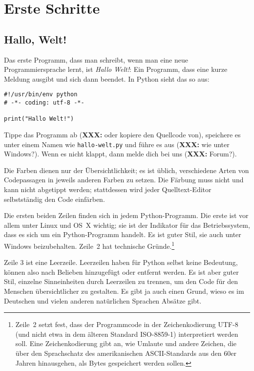 \documentclass{blatt}
\newcommand{\XXX}[1]{\textbf{XXX:} #1}
\begin{document}
\section{Erste Schritte}

\subsection{Hallo, Welt!}

Das erste Programm, dass man schreibt, wenn man eine neue Programmiersprache
lernt, ist \emph{Hallo Welt!}: Ein Programm, dass eine kurze Meldung ausgibt
und sich dann beendet. In Python sieht das so aus:

\begin{verbatim}
#!/usr/bin/env python
# -*- coding: utf-8 -*-

print("Hallo Welt!")
\end{verbatim}

Tippe das Programm ab (\XXX{oder kopiere den Quellcode von}), speichere es unter
einem Namen wie \texttt{hallo-welt.py} und führe es aus (\XXX{wie unter Windows?}).
Wenn es nicht klappt, dann melde dich bei uns (\XXX{Forum?}).

Die Farben dienen nur der Übersichtlichkeit; es ist üblich, verschiedene Arten
von Codepassagen in jeweils anderen Farben zu setzen. Die Färbung muss nicht
und kann nicht abgetippt werden; stattdessen wird jeder Quelltext-Editor
selbstständig den Code einfärben.

Die ersten beiden Zeilen finden sich in jedem Python-Programm. Die erste ist
vor allem unter Linux und OS~X wichtig; sie ist der Indikator für das
Betriebssystem, dass es sich um ein Python-Programm handelt. Es ist guter Stil,
sie auch unter Windows beizubehalten. Zeile~2 hat technische
Gründe.\footnote{Zeile~2 setzt fest, dass der Programmcode in der
Zeichenkodierung UTF-8 (und nicht etwa in dem älteren Standard ISO-8859-1)
interpretiert werden soll. Eine Zeichenkodierung gibt an, wie Umlaute und
andere Zeichen, die über den Sprachschatz des amerikanischen ASCII-Standards
aus den 60er Jahren hinausgehen, als Bytes gespeichert werden sollen.}

Zeile 3 ist eine Leerzeile. Leerzeilen haben für Python selbst keine Bedeutung,
können also nach Belieben hinzugefügt oder entfernt werden. Es ist aber guter
Stil, einzelne Sinneinheiten durch Leerzeilen zu trennen, um den Code für den
Menschen übersichtlicher zu gestalten. Es gibt ja auch einen Grund, wieso es im
Deutschen und vielen anderen natürlichen Sprachen Absätze gibt.
\end{document}
